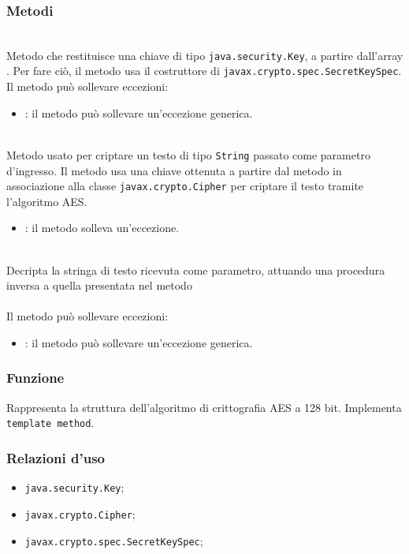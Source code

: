 \subsubsection*{Metodi}
\begin{description}
	\item{}\\
	Metodo che restituisce una chiave di tipo \texttt{java.security.Key}, a partire dall'array . Per fare ciò, il metodo usa il costruttore di \texttt{javax.crypto.spec.SecretKeySpec}.
	Il metodo può sollevare eccezioni:
	\begin{itemize}
		\item {}: il metodo può sollevare un'eccezione generica.
	\end{itemize}
	\item{}\\
	Metodo usato per criptare un testo di tipo \texttt{String} passato come parametro d'ingresso. Il metodo usa una chiave ottenuta a partire dal metodo  in associazione alla classe \texttt{javax.crypto.Cipher} per criptare il testo tramite l'algoritmo AES.
	\begin{itemize}
		\item {}: il metodo solleva un'eccezione.
	\end{itemize}
	\item{}\\
	Decripta la stringa di testo ricevuta come parametro, attuando una procedura inversa a quella presentata nel metodo \\\\
	Il metodo può sollevare eccezioni:
	\begin{itemize}
		\item {}: il metodo può sollevare un'eccezione generica.
	\end{itemize}
\end{description}


\subsubsection*{Funzione}
Rappresenta la struttura dell'algoritmo di crittografia AES a 128 bit. Implementa \texttt{template method}.

\subsubsection*{Relazioni d'uso}
\begin{itemize}
	\item \texttt{java.security.Key};
	\item \texttt{javax.crypto.Cipher};
	\item \texttt{javax.crypto.spec.SecretKeySpec};
\end{itemize}

